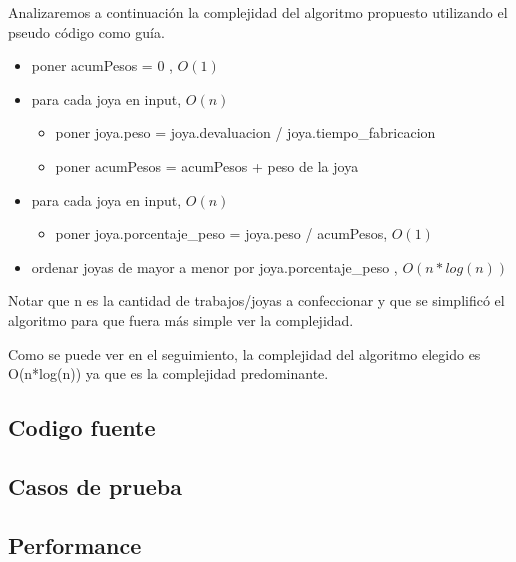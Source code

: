 Analizaremos a continuaci\'on la complejidad del algoritmo propuesto utilizando el pseudo c\'odigo como gu\'ia.

\begin{itemize}
\item poner acumPesos = 0 , $O(1)$
\item para cada  joya en input, $O(n)$
\begin{itemize}
\item poner joya.peso = joya.devaluacion / joya.tiempo\_fabricacion
\item poner acumPesos = acumPesos + peso de la joya
\end{itemize}
	
\item para cada joya en input, $O(n)$
\begin{itemize}
	\item poner joya.porcentaje\_peso = joya.peso / acumPesos, $O(1)$
\end{itemize}

\item ordenar joyas de mayor a menor por joya.porcentaje\_peso , $O(n*log(n))$
\end{itemize}



Notar que n es la cantidad de trabajos/joyas a confeccionar y que se simplific\'o el algoritmo para que fuera m\'as simple ver la complejidad.

Como se puede ver en el seguimiento, la complejidad del algoritmo elegido es O(n*log(n)) ya que es la complejidad predominante.\\

\subsection{Codigo fuente}

\subsection{Casos de prueba}

\subsection{Performance}
